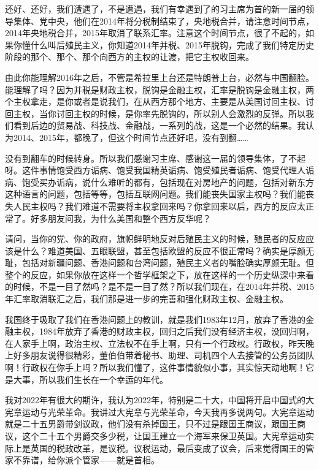\documentclass[UTF8, 12pt, a4paper]{ctexrep}
\begin{document}
还好、还好，我们遭遇了，不是遭遇，我们有幸遇到了的习主席为首的新一届的领导集体、党中央，他们在2014年将分税制结束了，央地税合并，请注意时间节点，2014年央地税合并，2015年取消了联系汇率。注意这个时间节点，很了不起的，如果你懂什么叫后殖民主义，你知道2014年并税、2015年脱钩，完成了我们特定历史阶段的那个、那个、那个向西方的主权的让渡，把它主权收回来。

由此你能理解2016年之后，不管是希拉里上台还是特朗普上台，必然与中国翻脸。能理解了吗？因为并税是财政主权，脱钩是金融主权，汇率是脱钩是金融主权，两个主权拿走，是你或者是说我们，在从西方那个地方、主要是从美国讨回主权、讨回主权，当你讨回主权的时候，是你率先脱钩的，所以别人会激烈的反弹。所以我们看到后边的贸易战、科技战、金融战，一系列的战，这是一个必然的结果。我认为2014、2015年，都晚了，但这个时间节点还好吧，没有到翻……

没有到翻车的时候转身。所以我们感谢习主席、感谢这一届的领导集体，了不起呀。这件事情饱受西方诟病、饱受我国精英诟病、饱受殖民者诟病、饱受代理人诟病、饱受买办诟病，说什么难听的都有，包括现在对房地产的问题，包括对新东方这种语言的问题，包括等等，包括互联网问题。我们能丧失国家主权吗？我们能丧失人民主权吗？我们难道不需要将主权拿回来吗？你拿回来以后，西方的反应太正常了。好多朋友问我，为什么美国和整个西方反华呢？

请问，当你的党、你的政府，旗帜鲜明地反对后殖民主义的时候，殖民者的反应应该是什么？难道美国、五眼联盟，甚至包括欧盟的反应不很正常吗？确实是厚颜无耻，包括对新疆问题、香港问题和台湾问题，殖民主义者的嘴脸确实厚颜无耻。但整个的反应，如果你放在这样一个哲学框架之下，放在这样的一个历史纵深中来看的时候，不是一目了然吗？是不是一目了然？所以我们现在，在2014年并税、2015年汇率取消联汇之后，我们那是进一步的完善和强化财政主权、金融主权。

我国终于吸取了我们在香港问题上的教训，就是我们1983年12月，放弃了香港的金融主权，1984年放弃了香港的财政主权，回归之后我们没有经济主权，没回归啊，在人家手上啊，政治主权、立法权不在手上啊，只有一个行政权。行政权，昨天晚上好多朋友说得很精彩，董伯伯带着秘书、助理、司机四个人去接管的公务员团队啊！行政权在你手上吗？所以我们懂了，这件事情貌似小事，其实惊天动地啊！它是大事，所以我们生长在一个幸运的年代。

我对2022年有很大的期许，我认为2022年，特别是二十大，中国将开启中国式的大宪章运动与光荣革命。我讲过大宪章与光荣革命，今天我再多说两句。大宪章运动就是二十五男爵带剑议政，他们没有杀掉国王，只不过是跟国王商议，跟国王商议，这个二十五个男爵交多少税，让国王建立一个海军来保卫英国。大宪章运动实际上是英国的税政改革，是议税。议税运动，最后变成了议会，后来觉得国王的管家不靠谱，给你派个管家——就是首相。
\end{document}
